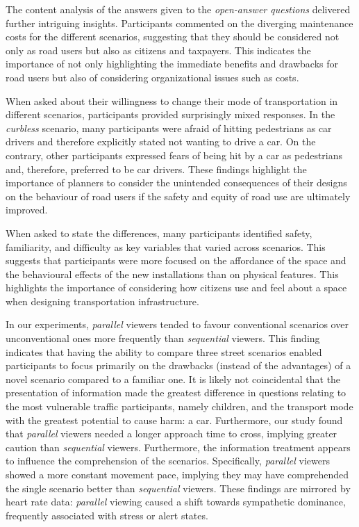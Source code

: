 The content analysis of the answers given to the \emph{open-answer questions} delivered further intriguing insights. 
Participants commented on the diverging maintenance costs for the different scenarios, suggesting that they should be considered not only as road users but also as citizens and taxpayers. This indicates the importance of not only highlighting the immediate benefits and drawbacks for road users but also of considering organizational issues such as costs. 

When asked about their willingness to change their mode of transportation in different scenarios, participants provided surprisingly mixed responses. In the \emph{curbless} scenario, many participants were afraid of hitting pedestrians as car drivers and therefore explicitly stated not wanting to drive a car. On the contrary, other participants expressed fears of being hit by a car as pedestrians and, therefore, preferred to be car drivers. These findings highlight the importance of planners to consider the unintended consequences of their designs on the behaviour of road users if the safety and equity of road use are ultimately improved.

When asked to state the differences, many participants identified safety, familiarity, and difficulty as key variables that varied across scenarios. 
This suggests that participants were more focused on the affordance of the space \cite{GibsonJames1979} and the behavioural effects of the new installations than on physical features. 
This highlights the importance of considering how citizens use and feel about a space when designing transportation infrastructure.

In our experiments, \emph{parallel} viewers tended to favour conventional scenarios over unconventional ones more frequently than \emph{sequential} viewers. This finding indicates that having the ability to compare three street scenarios enabled participants to focus primarily on the drawbacks (instead of the advantages) of a novel scenario compared to a familiar one. It is likely not coincidental that the presentation of information made the greatest difference in questions relating to the most vulnerable traffic participants, namely children, and the transport mode with the greatest potential to cause harm: a car. Furthermore, our study found that \emph{parallel} viewers needed a longer approach time to cross, implying greater caution than \emph{sequential} viewers. 
Furthermore, the information treatment appears to influence the comprehension of the scenarios. Specifically, \emph{parallel} viewers showed a more constant movement pace, implying they may have comprehended the single scenario better than \emph{sequential} viewers.
These findings are mirrored by heart rate data: \emph{parallel} viewing caused a shift towards sympathetic dominance, frequently associated with stress or alert states.

